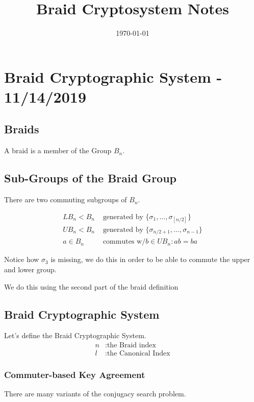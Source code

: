 \documentclass{article}
\title{Braid Cryptosystem Notes}
\date{\today}
\begin{document}
	\maketitle
	
	\section{Braid Cryptographic System - 11/14/2019}
	
	\subsection{Braids}
	A braid is a member of the Group $B_n$.
	
	\subsection{Sub-Groups of the Braid Group}
	There are two commuting subgroups of $B_n$.
	
	\begin{align*}
		LB_n < B_n & \text{ generated by } \{ \sigma_1 , ..., \sigma_{ \left[ n/2 \right] } \}  \\
		UB_n < B_n & \text{ generated by } \{ \sigma_{ n/2 + 1 }, ..., \sigma_{n-1} \} \\
		a \in B_n & \text{ commutes w/} b \in UB_n : ab = ba 
	\end{align*}
	
	Notice how $\sigma_3$ is missing, we do this in order to be able to commute the upper and lower group.
	
	We do this using the second part of the braid definition
	
	\subsection{Braid Cryptographic System}
	Let's define the Braid Cryptographic System.
	\begin{align*}
	n &: \text{the Braid index} \\
	l &: \text{the Canonical Index}
	\end{align*}
	
	\subsubsection{Commuter-based Key Agreement}
	
	There are many variants of the conjugacy search problem.
	
\end{document}
